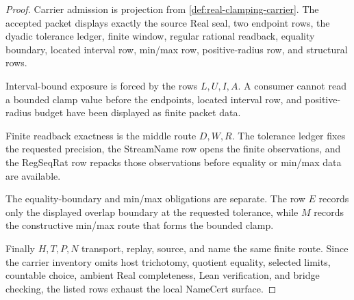 \begin{proof}
Carrier admission is projection from \autoref{def:real-clamping-carrier}. The accepted packet displays exactly the source Real seal, two endpoint rows, the dyadic tolerance ledger, finite window, regular rational readback, equality boundary, located interval row, min/max row, positive-radius row, and structural rows.

Interval-bound exposure is forced by the rows $L,U,I,A$. A consumer cannot read a bounded clamp value before the endpoints, located interval row, and positive-radius budget have been displayed as finite packet data.

Finite readback exactness is the middle route $D,W,R$. The tolerance ledger fixes the requested precision, the StreamName row opens the finite observations, and the RegSeqRat row repacks those observations before equality or min/max data are available.

The equality-boundary and min/max obligations are separate. The row $E$ records only the displayed overlap boundary at the requested tolerance, while $M$ records the constructive min/max route that forms the bounded clamp.

Finally $H,T,P,N$ transport, replay, source, and name the same finite route. Since the carrier inventory omits host trichotomy, quotient equality, selected limits, countable choice, ambient Real completeness, Lean verification, and bridge checking, the listed rows exhaust the local NameCert surface.
\end{proof}

